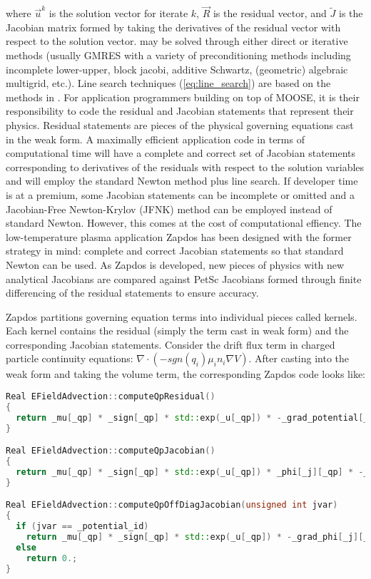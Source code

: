 where $\vec{u}^k$ is the solution vector for iterate $k$, $\vec{R}$ is the residual vector, and $\tilde{J}$ is the Jacobian matrix formed by taking the derivatives of the residual vector with respect to the solution vector.\cite{knoll2004jacobian}  may be solved through either direct or iterative methods (usually GMRES with a variety of preconditioning methods including incomplete lower-upper, block jacobi, additive Schwartz, (geometric) algebraic multigrid, etc.). Line search techniques (\cref{eq:line_search}) are based on the methods in \cite{dennis1996numerical}. For application programmers building on top of MOOSE, it is their responsibility to code the residual and Jacobian statements that represent their physics. Residual statements are pieces of the physical governing equations cast in the weak form. A maximally efficient application code in terms of computational time will have a complete and correct set of Jacobian statements corresponding to derivatives of the residuals with respect to the solution variables and will employ the standard Newton method plus line search. If developer time is at a premium, some Jacobian statements can be incomplete or omitted and a Jacobian-Free Newton-Krylov (JFNK) method can be employed instead of standard Newton. However, this comes at the cost of computational effiency. The low-temperature plasma application Zapdos has been designed with the former strategy in mind: complete and correct Jacobian statements so that standard Newton can be used. As Zapdos is developed, new pieces of physics with new analytical Jacobians are compared against PetSc Jacobians formed through finite differencing of the residual statements to ensure accuracy.

Zapdos partitions governing equation terms into individual pieces called kernels. Each kernel contains the residual (simply the term cast in weak form) and the corresponding Jacobian statements. Consider the drift flux term in charged particle continuity equations: $\nabla\cdot\left(-sgn(q_i)\mu_in_i\nabla V\right)$. After casting into the weak form and taking the volume term, the corresponding Zapdos code looks like:

\begin{lstlisting}[language=C++,caption = Example of residual and Jacobian function definitions, label = code:resid_jacob]
Real EFieldAdvection::computeQpResidual()
{
  return _mu[_qp] * _sign[_qp] * std::exp(_u[_qp]) * -_grad_potential[_qp] * -_grad_test[_i][_qp];
}

Real EFieldAdvection::computeQpJacobian()
{
  return _mu[_qp] * _sign[_qp] * std::exp(_u[_qp]) * _phi[_j][_qp] * -_grad_potential[_qp] * -_grad_test[_i][_qp];
}

Real EFieldAdvection::computeQpOffDiagJacobian(unsigned int jvar)
{
  if (jvar == _potential_id)
    return _mu[_qp] * _sign[_qp] * std::exp(_u[_qp]) * -_grad_phi[_j][_qp] * -_grad_test[_i][_qp];
  else
    return 0.;
}
\end{lstlisting}

